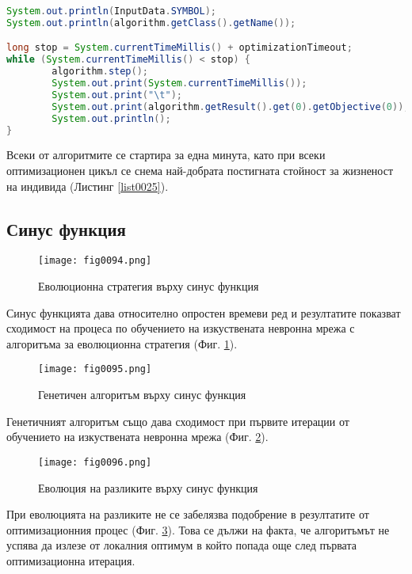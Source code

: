 \begin{lstlisting}[caption=Отчитане на междинните стойности в процеса по оптимизация, language=Java, basicstyle=\tiny, label=list0025]
System.out.println(InputData.SYMBOL);
System.out.println(algorithm.getClass().getName());

long stop = System.currentTimeMillis() + optimizationTimeout;
while (System.currentTimeMillis() < stop) {
        algorithm.step();
        System.out.print(System.currentTimeMillis());
        System.out.print("\t");
        System.out.print(algorithm.getResult().get(0).getObjective(0));
        System.out.println();
}
\end{lstlisting}

Всеки от алгоритмите се стартира за една минута, като при всеки оптимизационен цикъл се снема най-добрата постигната стойност за жизненост на индивида (Листинг \ref{list0025}).

\subsection{Синус функция}

\begin{figure}[H]
  \centering
  \texttt{[image: fig0094.png]}
  \caption{Еволюционна стратегия върху синус функция}
\label{fig0094}
\end{figure}

Синус функцията дава относително опростен времеви ред и резултатите показват сходимост на процеса по обучението на изкуствената невронна мрежа с алгоритъма за еволюционна стратегия (Фиг. \ref{fig0094}).

\begin{figure}[H]
  \centering
  \texttt{[image: fig0095.png]}
  \caption{Генетичен алгоритъм върху синус функция}
\label{fig0095}
\end{figure}

Генетичният алгоритъм също дава сходимост при първите итерации от обучението на изкуствената невронна мрежа (Фиг. \ref{fig0095}).

\begin{figure}[H]
  \centering
  \texttt{[image: fig0096.png]}
  \caption{Еволюция на разликите върху синус функция}
\label{fig0096}
\end{figure}

При еволюцията на разликите не се забелязва подобрение в резултатите от оптимизационния процес (Фиг. \ref{fig0096}). Това се дължи на факта, че алгоритъмът не успява да излезе от локалния оптимум в който попада още след първата оптимизационна итерация. 

